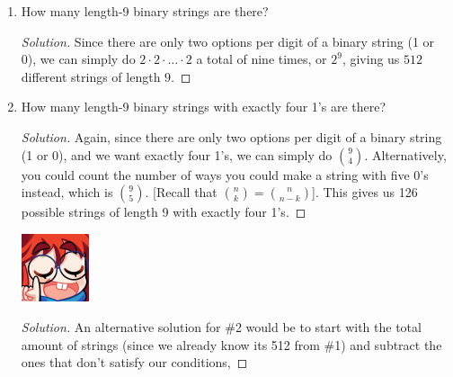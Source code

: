\documentclass{article}
\newenvironment{solution}
  {\renewcommand\qedsymbol{$\blacksquare$}\begin{proof}[Solution]}
  {\end{proof}}
\begin{document}
\begin{enumerate}
    \item How many length-9 binary strings are there?\begin{solution} 
        Since there are only two options per digit of a binary string (1 or 0), we can simply do $ 2 \cdot 2 \cdot \hdots \cdot 2$ a total of nine times, or $2^9$, giving us $512$ different strings of length $9$. 
    \end{solution} 
    \item How many length-9 binary strings with exactly four 1's are there?\begin{solution} 
        Again, since there are only two options per digit of a binary string (1 or 0), and we want exactly four 1's, we can simply do $\binom{9}{4}$. Alternatively, you could count the number of ways you could make a string with 
        five 0's instead, which is $\binom{9}{5}$. [Recall that $\binom{n}{k} = \binom{n}{n-k}$]. This gives us 126 possible strings of length 9 with exactly four 1's. 
    \end{solution}%
    \begin{minipage}[t]{.14\textwidth}
        \vspace{0pt}
        \includegraphics[width=2cm]{nerd_maddy.png} 
    \end{minipage}%
    \begin{solution} 
        An alternative solution for \#2 would be to start with the total amount of strings (since we already know its 512 from \#1) and subtract the ones that don't satisfy our conditions, 

\end{solution}
\end{enumerate}
\end{document}
